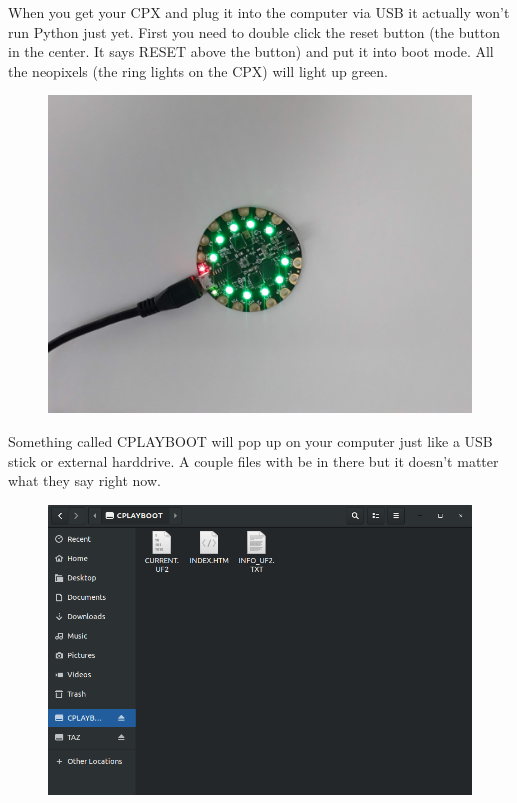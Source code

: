 When you get your CPX and plug it into the computer via USB it
actually won't run Python just yet. First you need to double click the
reset button (the button in the center. It says RESET above the
button) and put it into boot mode. All the neopixels (the ring lights
on the CPX) will light up green. 
\begin{figure}[H]
  \begin{center}
    \includegraphics[width=\textwidth]{Figures/CPX_boot.jpeg}
  \end{center}
\end{figure}
Something called CPLAYBOOT will pop up on your computer just like a
USB stick or external harddrive. A couple files with be in there but
it doesn’t matter what they say right now.
\begin{figure}[H]
  \begin{center}
    \includegraphics[width=\textwidth]{Figures/CPLAYBOOT.png}
  \end{center}
\end{figure}
